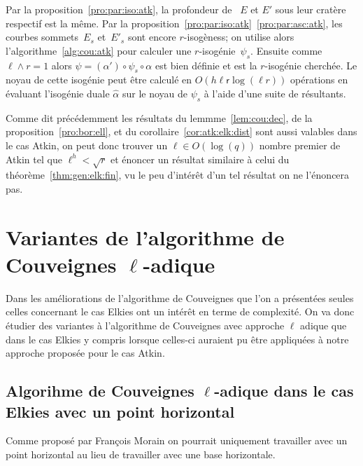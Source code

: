 \documentclass[10pt,a4paper]{book}
\theoremstyle{plain}
\newtheorem{thm}{Théorème}[chapter]
\theoremstyle{definition}
\theoremstyle{definition}
\theoremstyle{definition}
\theoremstyle{definition}
\theoremstyle{remark}
\theoremstyle{remark}
\theoremstyle{definition}
\begin{document}
Par la proposition~\ref{pro:par:iso:atk}, la profondeur de ~$E$ et $E'$ sous
leur cratère respectif est la même.  Par la
proposition~\ref{pro:par:iso:atk}~\ref{pro:par:asc:atk}, les
courbes sommets~$E_{s}$ et~$E'_{s}$ sont encore $r$-isogèness; on utilise
alors l'algorithme~\ref{alg:cou:atk} pour calculer une $r$-isogénie~$\psi_{s}$.  
Ensuite comme $\ell \wedge r =1$ alors $\psi = (\alpha ') \circ \psi_{s} \circ 
\alpha$ est bien définie et est la $r$-isogénie cherchée.
Le noyau de cette isogénie peut être calculé en $O(h\mathsf{\ell r}\log(\ell r))$
opérations en évaluant l'isogénie duale $\widehat{\alpha}$ sur le noyau de 
$\psi_s$ à l'aide d'une suite de résultants. 

Comme dit précédemment les résultats du lemmme~\ref{lem:cou:dec}, de la proposition~\ref{pro:bor:ell},
 et du corollaire~\ref{cor:atk:elk:dist} sont 
aussi valables dans le cas Atkin, on peut donc trouver un $\ell \in O(\log(q))$
nombre premier de Atkin tel que $\ell^h<\sqrt{r}$ et énoncer un résultat 
similaire à celui du théorème~\ref{thm:gen:elk:fin}, vu le peu d'intérêt d'un 
tel résultat on ne l'énoncera pas. 



\chapter{Variantes de l'algorithme de Couveignes $\ell$-adique}
Dans les améliorations de l'algorithme de Couveignes que l'on a présentées 
seules celles concernant le cas Elkies ont un intérêt en terme de complexité. 
On va donc étudier des variantes à l'algorithme de Couveignes avec 
approche $\ell$ adique que dans le cas Elkies y compris lorsque celles-ci
auraient pu être appliquées à notre approche proposée pour le cas Atkin.
\section{Algorihme de Couveignes $\ell$-adique dans le cas Elkies avec un point horizontal}
\label{sec:var:cou:uni}
Comme proposé par François Morain on pourrait uniquement travailler avec un 
point horizontal au lieu de travailler avec une base horizontale.
\end{document}
